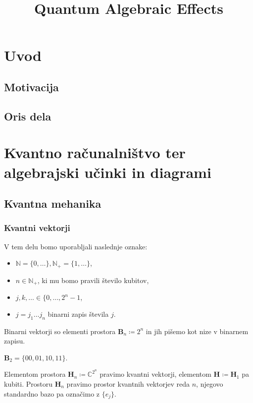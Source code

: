 \documentclass[mat1]{fmfdelo}
\title{Quantum Algebraic Effects}
\newcommand{\N}{\mathbb N}
\newcommand{\C}{\mathbb C}
\newcommand{\B}[1][]{\mathbf{B}_{#1}}
\renewcommand{\H}[1][]{\mathbf{H}_{#1}}
\begin{document}
\section{Uvod}
\subsection{Motivacija}
\subsection{Oris dela}  %

\section{Kvantno računalništvo ter algebrajski učinki in diagrami}
\subsection{Kvantna mehanika}

\subsubsection{Kvantni vektorji}

\begin{definicija}[Oznake]
    V tem delu bomo uporabljali naslednje oznake:
    \begin{itemize}
        \item \( \N = \{0, \dots \}, \N_+ = \{1, \dots\} \),
        \item \( n\in\N_+ \), ki mu bomo pravili število kubitov,
        \item \( j, k, \dots \in \{0, \dots, 2^n-1 \),
        \item \( j = j_1\dots j_n \) binarni zapis števila \( j \).
    \end{itemize}
\end{definicija}

\begin{definicija}
    Binarni vektorji so elementi prostora \( \B[n] \coloneqq 2^n \) in jih pišemo kot nize v binarnem zapisu.
\end{definicija}

\begin{primer}
    \(\B[2] = \{00, 01, 10, 11\}\).
\end{primer}

\begin{definicija}
    Elementom prostora \( \H[n] \coloneqq \C^{2^n} \) pravimo kvantni vektorji, elementom \( \H \coloneqq \H[1] \) pa kubiti.  Prostoru \( \H[n] \) pravimo prostor kvantnih vektorjev reda \( n \), njegovo standardno bazo pa označimo z \( \{e_j\} \).
\end{definicija}
\end{document}
